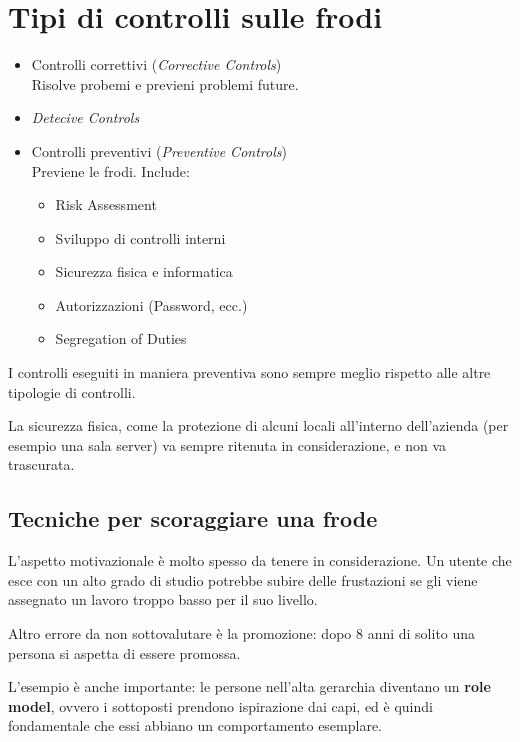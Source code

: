 \section{Tipi di controlli sulle frodi}

\begin{itemize}
\item Controlli correttivi (\emph{Corrective Controls}) \\
Risolve probemi e previeni problemi future.
\item \emph{Detecive Controls}\\ 
\item Controlli preventivi (\emph{Preventive Controls})\\
Previene le frodi.
Include:
	\begin{itemize}
	\item Risk Assessment
	\item Sviluppo di controlli interni
	\item Sicurezza fisica e informatica
	\item Autorizzazioni (Password, ecc.)
	\item Segregation of Duties
	\end{itemize}
\end{itemize}

I controlli eseguiti in maniera preventiva sono sempre meglio rispetto alle
altre tipologie di controlli.

La sicurezza fisica, come la protezione di alcuni locali all'interno
dell'azienda (per esempio una sala server) va sempre ritenuta in
considerazione, e non va trascurata.

\subsection{Tecniche per scoraggiare una frode}

L'aspetto motivazionale è molto spesso da tenere in considerazione.
Un utente che esce con un alto grado di studio potrebbe subire delle
frustazioni se gli viene assegnato un lavoro troppo basso per il suo livello.

Altro errore da non sottovalutare è la promozione: dopo 8 anni di solito una
persona si aspetta di essere promossa.

L'esempio è anche importante: le persone nell'alta gerarchia diventano un
\textbf{role model}, ovvero i sottoposti prendono ispirazione dai capi, ed è
quindi fondamentale che essi abbiano un comportamento esemplare.

